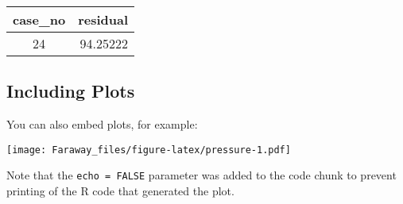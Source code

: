 \documentclass[
]{article}
\begin{document}
\captionsetup[table]{labelformat=empty,skip=1pt}
\begin{longtable}{cr}
\toprule
case\_no & residual \\ 
\midrule
24 & 94.25222 \\ 
\bottomrule
\end{longtable}

\hypertarget{including-plots}{%
\subsection{Including Plots}\label{including-plots}}

You can also embed plots, for example:

\texttt{[image: Faraway\_files/figure-latex/pressure-1.pdf]}

Note that the \texttt{echo\ =\ FALSE} parameter was added to the code
chunk to prevent printing of the R code that generated the plot.
\end{document}
